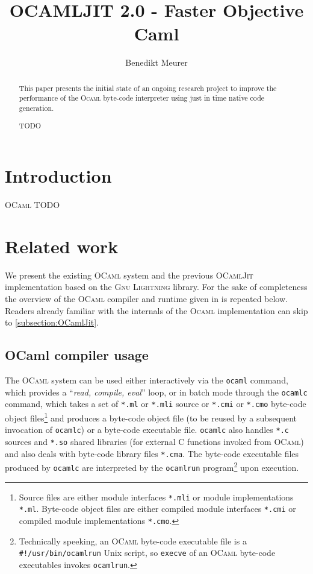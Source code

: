 \documentclass[10pt,a4paper,twocolumn]{article}
\author{Benedikt Meurer}
\title{OCAMLJIT 2.0 - Faster Objective Caml}
\begin{document}
\maketitle

\begin{abstract}
  This paper presents the initial state of an ongoing research
  project to improve the performance of the \textsc{Ocaml}
  byte-code interpreter using just in time native code generation.

  TODO
\end{abstract}


\section{Introduction}

\textsc{OCaml}\cite{Leroy10} TODO


\section{Related work}

We present the existing \textsc{OCaml} system and the previous \textsc{OCamlJit}\cite{Starynkevitch04}
implementation based on the \textsc{Gnu Lightning}\cite{Bonzini10} library. For the sake of completeness
the overview of the \textsc{OCaml} compiler and runtime given in \cite{Starynkevitch04} is repeated below.
Readers already familiar with the internals of the \textsc{Ocaml} implementation can skip to
\ref{subsection:OCamlJit}.

\subsection{OCaml compiler usage}

The \textsc{OCaml} system can be used either interactively via the \texttt{ocaml} command, which
provides a ``\textit{read, compile, eval}'' loop, or in batch mode through the \texttt{ocamlc}
command, which takes a set of \texttt{*.ml} or \texttt{*.mli} source or \texttt{*.cmi} or
\texttt{*.cmo} byte-code object files\footnote{Source files are either module interfaces
  \texttt{*.mli} or module implementations \texttt{*.ml}. Byte-code object files are either
  compiled module interfaces \texttt{*.cmi} or compiled module implementations \texttt{*.cmo}.}
and produces a byte-code object file (to be reused by a subsequent invocation of \texttt{ocamlc})
or a byte-code executable file. \texttt{ocamlc} also handles \texttt{*.c} sources and \texttt{*.so}
shared libraries (for external C functions invoked from \textsc{OCaml}) and also deals with
byte-code library files \texttt{*.cma}. The byte-code executable files produced by \texttt{ocamlc}
are interpreted by the \texttt{ocamlrun} program\footnote{Technically speeking, an \textsc{OCaml}
  byte-code executable file is a \texttt{\#!/usr/bin/ocamlrun} Unix script, so \texttt{execve}
  of an \textsc{OCaml} byte-code executables invokes \texttt{ocamlrun}.} upon execution.
\end{document}
